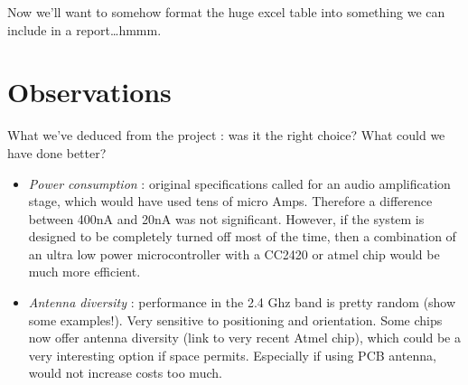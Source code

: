 Now we'll want to somehow format the huge excel table into something we can
include in a report\ldots hmmm.

\section{Observations}

What we've deduced from the project : was it the right choice? What could we
have done better?

\begin{itemize}
  \item \emph{Power consumption} : original specifications called for an audio
    amplification stage, which would have used tens of micro Amps.
    Therefore a difference between 400nA and 20nA was not significant. However,
    if the system is designed to be completely turned off most of the time, then
    a combination of an ultra low power microcontroller with a CC2420 or atmel
    chip would be much more efficient.
  \item \emph{Antenna diversity} : performance in the 2.4 Ghz band is pretty
    random (show some examples!). Very sensitive to positioning and orientation.
    Some chips now offer antenna diversity (link to very recent Atmel chip),
    which could be a very interesting option if space permits. Especially if
    using PCB antenna, would not increase costs too much.
\end{itemize}
